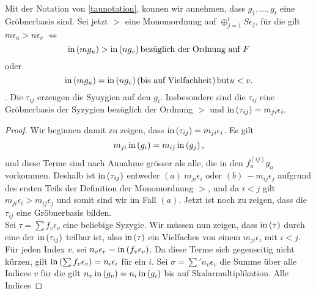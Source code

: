 \documentclass{article}
\begin{document}
	\begin{thm}[Schreyer \cite{Eis1}[15.10]
		Mit der Notation von \ref{taunotation}, 
		konnen wir annehmen,
		dass
		\( g_1,\dots,g_t\)
		eine Gr\"obnerbasis sind.
		Sei jetzt 
		\( > \) 
		eine Monomordnung auf 
		\( \oplus_{j=1}^t S \epsilon_{j} \),
		f\"ur die gilt
		\( m \epsilon_{u} > n \epsilon_{v} \)
		\(\iff\)
		\[
			\operatorname{in}\left(  m g_{u} \right) > \operatorname{in}\left( n g_{v} \right) 
			\text{bez\"uglich der Ordnung auf } F 
		\]
		oder
		\[
			\operatorname{in}\left( m g_{u} \right) = \operatorname{in}\left( n g_{v} \right) 
			\left( \text{bis auf Vielfachheit} \right) \text{but} u < v.
		\].
		Die
		\( \tau_{ij} \) 
		erzeugen die Syuygien auf den
		\( g_{i} \).
		Insbesondere sind die
		\( \tau_{ij} \)
		eine Gr\"obnerbasis der Syzygien bez\"uglich der Ordnung
		\( > \)
		und 
		\( \operatorname{in}\left( \tau_{ij} \right) = m_{ji}\epsilon_{i}.\)
		\begin{proof}
			Wir beginnen damit zu zeigen, dass
			\( \operatorname{in} \left( \tau_{ij} \right) 
			=
			m_{ji} \epsilon_{i} \).
			Es gilt 
			\[
				m_{ji} \operatorname{in} \left( g_{i} \right) 
				= m_{ij} \operatorname{in} \left( g_{j} \right),
			\]
			und diese Terme sind nach Annahme gr\"osser als alle,
			die in den 
			\( f_{u}^{\left( ij \right)} g_{u} \)
			vorkommen.
			Deshalb ist
			\( \operatorname{in}\left( \tau_{ij} \right) \)
			entweder
			\( (a) \ m_{ji} \epsilon_{i} \)
			oder
			\( (b) \ -m_{ij}\epsilon_{j} \)
			aufgrund des ersten Teils der Definition der Monomordnung
			\( > \),
			und da
			\( i < j \)
			gilt
			\( m_{ji} \epsilon_{i} 
			> m_{ij}\epsilon_{j} \)
			und somit sind wir im Fall 
			\( (a) \).
			Jetzt ist noch zu zeigen,
			dass die 
			\( \tau_{ij} \)
			eine Gr\"obnerbasis bilden. \\
			Sei 
			\( \tau = \sum f_{v} \epsilon_{v}\)
			eine beliebige Syzygie.
			Wir m\"ussen nun zeigen,
			dass 
			\( \operatorname{in}\left( \tau \right) \)
			durch eine der 
			\( \operatorname{in}\left( \tau_{ij} \right)\)
			teilbar ist,
			also
			\( \operatorname{in}\left( \tau \right) \)
			ein Vielfaches von einem
			\( m_{ji} \epsilon_{i} \)
			mit
			\( i<j \).\\
			F\"ur jeden Index
			\(v \),
			sei
			\(n_{v} \epsilon_{v}
			=\operatorname{in}\left( f_{v}\epsilon_{v} \right) \).
			Da diese Terme sich gegenseitig nicht k\"urzen,
			gilt
			\( \operatorname{in}\left( \sum f_{v}\epsilon_{v} \right)=
			n_{i}\epsilon_{i}\)
			f\"ur ein 
			\( i\).
			Sei
			\( \sigma=\sum'n_{v} \epsilon_{v} \)
			die Summe \"uber alle Indices
			\( v \)
			f\"ur die gilt
			\( n_v \operatorname{in} \left( g_{v} \right)
			=n_{i} \operatorname{in}\left( g_{i} \right) \)
			bis auf Skalarmultiplikation.
			Alle Indices

\end{proof}
\end{thm}
\end{document}
